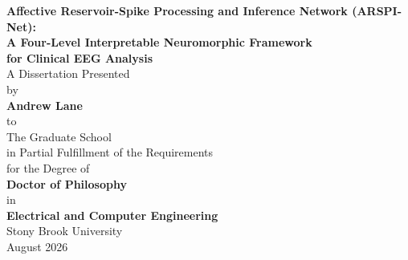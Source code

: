 \documentclass[12pt]{report}
\begin{document}

\begin{titlepage}
\singlespacing
\centering
\vspace*{1cm}
{\Large \textbf{Affective Reservoir-Spike Processing and Inference Network (ARSPI-Net):}}\\[0.5cm]
{\Large \textbf{A Four-Level Interpretable Neuromorphic Framework}}\\[0.3cm]
{\Large \textbf{for Clinical EEG Analysis}}\\[2cm]
{\large A Dissertation Presented}\\[0.3cm]
{\large by}\\[0.5cm]
{\Large \textbf{Andrew Lane}}\\[1cm]
{\large to}\\[0.3cm]
{\large The Graduate School}\\[0.3cm]
{\large in Partial Fulfillment of the Requirements}\\[0.3cm]
{\large for the Degree of}\\[0.5cm]
{\Large \textbf{Doctor of Philosophy}}\\[0.5cm]
{\large in}\\[0.1cm]
{\Large \textbf{Electrical and Computer Engineering}}\\[1.2cm]
{\large Stony Brook University}\\[0.4cm]
{\large August 2026}
\end{titlepage}
\end{document}
